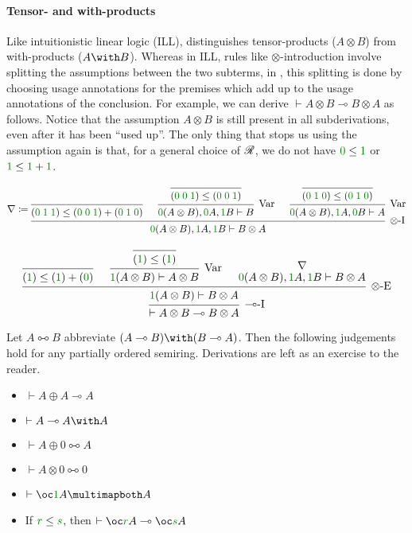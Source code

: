 \paragraph{Tensor- and with-products}
Like intuitionistic linear logic (ILL), \name{} distinguishes tensor-products
($A \otimes B$) from with-products ($A \with B$).
Whereas in ILL, rules like $\otimes$-introduction involve splitting the
assumptions between the two subterms, in \name{}, this splitting is done by
choosing usage annotations for the premises which add up to the usage
annotations of the conclusion.
For example, we can derive $\vdash A \otimes B \multimap B \otimes A$ as
follows.
Notice that the assumption $A \otimes B$ is still present in all subderivations,
even after it has been ``used up''.
The only thing that stops us using the assumption again is that, for a general
choice of $\mathscr R$, we do not have $\gr0 \leq \gr1$ or $\gr1 \leq \gr1 + \gr1$.

\begin{small}
  \[
    \nabla \coloneqq
    \begin{prooftree}
      \infer0{\plr{\gr0\;\gr1\;\gr1} \leq
        \plr{\gr0\;\gr0\;\gr1} + \plr{\gr0\;\gr1\;\gr0}}
      \infer0{\plr{\gr0\;\gr0\;\gr1} \leq \plr{\gr0\;\gr0\;\gr1}}
      \infer1[Var]{\gr0\plr{A \otimes B}, \gr0A, \gr1B \vdash B}
      \infer0{\plr{\gr0\;\gr1\;\gr0} \leq \plr{\gr0\;\gr1\;\gr0}}
      \infer1[Var]{\gr0\plr{A \otimes B}, \gr1A, \gr0B \vdash A}
      \infer3[$\otimes$-I]%
      {\gr0\plr{A \otimes B}, \gr1A, \gr1B \vdash B \otimes A}
    \end{prooftree}
  \]

  \[
    \begin{prooftree}
      \infer0{\plr{\gr1} \leq \plr{\gr1} + \plr{\gr0}}
      \infer0{\plr{\gr1} \leq \plr{\gr1}}
      \infer1[Var]{\gr1\plr{A \otimes B} \vdash A \otimes B}
      \hypo{\nabla}
      \infer[no rule]1{\gr0\plr{A \otimes B}, \gr1A, \gr1B \vdash B \otimes A}
      \infer3[$\otimes$-E]{\gr1\plr{A \otimes B} \vdash B \otimes A}
      \infer1[$\multimap$-I]{\vdash A \otimes B \multimap B \otimes A}
    \end{prooftree}
  \]
\end{small}

\begin{example}
  Let $A \multimapboth B$ abbreviate
  $\plr{A \multimap B} \with \plr{B \multimap A}$.
  Then the following judgements hold for any partially ordered semiring.
  Derivations are left as an exercise to the reader.
  \begin{itemize}
    \item $\vdash A \oplus A \multimap A$
    \item $\vdash A \multimap A \with A$
    \item $\vdash A \oplus 0 \multimapboth A$
    \item $\vdash A \otimes 0 \multimapboth 0$
    \item $\vdash \oc\gr1A \multimapboth A$
    \item If $\gr r \leq \gr s$, then $\vdash \oc\gr rA \multimap \oc\gr sA$
  \end{itemize}
\end{example}

